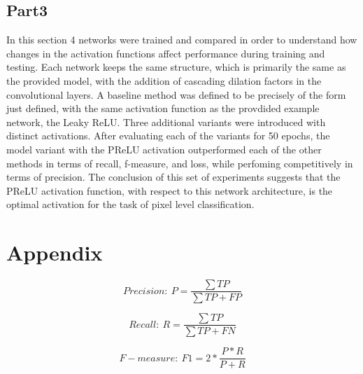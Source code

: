 \documentclass{article}
\begin{document}
\subsection{Part3}
In this section 4 networks were trained and compared in order to understand how changes in the activation functions affect performance during training and testing. Each network keeps the same structure, which is primarily the same as the provided model, with the addition of cascading dilation factors in the convolutional layers. A baseline method was defined to be precisely of the form just defined, with the same activation function as the provdided example network, the Leaky ReLU. Three additional variants were introduced with distinct activations. After evaluating each of the variants for 50 epochs, the model variant with the PReLU activation outperformed each of the other methods in terms of recall, f-measure, and loss, while perfoming competitively in terms of precision. The conclusion of this set of experiments suggests that the PReLU activation function, with respect to this network  architecture, is the optimal activation for the task of pixel level classification.


\section*{Appendix}
\begin{equation}
Precision: ~ P = \frac{\sum TP}{\sum TP + FP}
\end{equation}

\begin{equation}
Recall: ~ R = \frac{\sum TP}{\sum TP + FN}
\end{equation}

\begin{equation}
F-measure: ~ F1 = 2*\frac{P*R}{P + R}
\end{equation}
\end{document}
